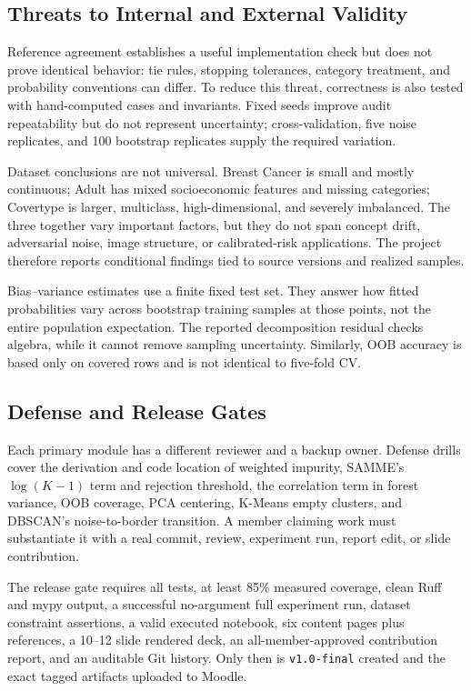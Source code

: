 \documentclass[conference]{IEEEtran}
\begin{document}
\subsection{Threats to Internal and External Validity}
Reference agreement establishes a useful implementation check but does not
prove identical behavior: tie rules, stopping tolerances, category treatment,
and probability conventions can differ. To reduce this threat, correctness is
also tested with hand-computed cases and invariants. Fixed seeds improve audit
repeatability but do not represent uncertainty; cross-validation, five noise
replicates, and 100 bootstrap replicates supply the required variation.

Dataset conclusions are not universal. Breast Cancer is small and mostly
continuous; Adult has mixed socioeconomic features and missing categories;
Covertype is larger, multiclass, high-dimensional, and severely imbalanced.
The three together vary important factors, but they do not span concept drift,
adversarial noise, image structure, or calibrated-risk applications. The
project therefore reports conditional findings tied to source versions and
realized samples.

Bias--variance estimates use a finite fixed test set. They answer how fitted
probabilities vary across bootstrap training samples at those points, not the
entire population expectation. The reported decomposition residual checks
algebra, while it cannot remove sampling uncertainty. Similarly, OOB accuracy
is based only on covered rows and is not identical to five-fold CV.

\subsection{Defense and Release Gates}
Each primary module has a different reviewer and a backup owner. Defense drills
cover the derivation and code location of weighted impurity, SAMME's
$\log(K-1)$ term and rejection threshold, the correlation term in forest
variance, OOB coverage, PCA centering, K-Means empty clusters, and DBSCAN's
noise-to-border transition. A member claiming work must substantiate it with a
real commit, review, experiment run, report edit, or slide contribution.

The release gate requires all tests, at least 85\% measured coverage, clean
Ruff and mypy output, a successful no-argument full experiment run, dataset
constraint assertions, a valid executed notebook, six content pages plus
references, a 10--12 slide rendered deck, an all-member-approved contribution
report, and an auditable Git history. Only then is \texttt{v1.0-final} created
and the exact tagged artifacts uploaded to Moodle.
\end{document}
